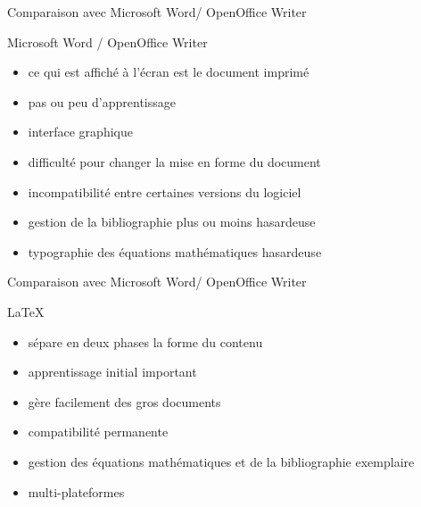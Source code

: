 \documentclass{beamer}
\begin{document}

\begin{frame}{Comparaison avec Microsoft Word/ OpenOffice Writer}
    \begin{block}{Microsoft Word / OpenOffice Writer}
        \begin{itemize}
 	\item ce qui est affiché à l'écran est le document imprimé
            \item pas ou peu d'apprentissage
            \item interface graphique
            \item difficulté pour changer la mise en forme du document
            \item incompatibilité entre certaines versions du logiciel
            \item gestion de la bibliographie plus ou moins hasardeuse
     \item typographie des équations mathématiques hasardeuse
        \end{itemize}
    \end{block}
\end{frame}


\begin{frame}{Comparaison avec Microsoft Word/ OpenOffice Writer}
    \begin{block}{\LaTeX}
        \begin{itemize}
            \item sépare en deux phases la forme du contenu
            \item apprentissage initial important
            \item gère facilement des gros documents
            \item compatibilité permanente
            \item gestion des équations mathématiques et de la bibliographie exemplaire
	 \item multi-plateformes
        \end{itemize}
    \end{block}
\end{frame}

\end{document}
